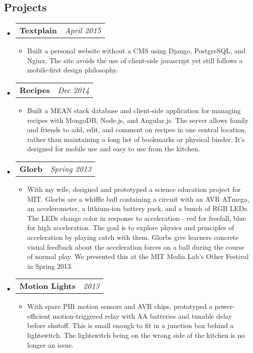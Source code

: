\documentclass[10pt,letterpaper]{article}
\newcommand{\headerrow}[2]{%
    \begin{tabularx}{\linewidth}{Xr}
	    #1 & #2 \\
    \end{tabularx}
}
\begin{document}
\subsection*{Projects}
    \begin{itemize}
        \item \headerrow{\textbf{Textplain}}{\textit{April 2015}}
        \begin{itemize}
            \item Built a personal website without a CMS using Django,
                PostgreSQL, and Nginx.  The site avoids the use of client-side
                javascript yet still follows a mobile-first design philosophy.
        \end{itemize}

        \item \headerrow{\textbf{Recipes}}{\textit{Dec 2014}}
        \begin{itemize}
            \item Built a MEAN stack database and client-side application for
                managing recipes with MongoDB, Node.js, and Angular.js.  The
                server allows family and friends to add, edit, and comment on
                recipes in one central location, rather than maintaining a long
                list of bookmarks or physical binder.  It's designed for mobile
                use and easy to use from the kitchen.
        \end{itemize}

        \item \headerrow{\textbf{Glorb}}{\textit{Spring 2013}}
        \begin{itemize}
            \item With my wife, designed and prototyped a science education
                project for MIT\@.  Glorbs are a whiffle ball containing a
                circuit with an AVR ATmega, an accelerometer, a lithium-ion
                battery pack, and a bunch of RGB LEDs.  The LEDs change color
                in response to acceleration---red for freefall, blue for high
                acceleration.  The goal is to explore physics and principles of
                acceleration by playing catch with them.  Glorbs give learners
                concrete visual feedback about the acceleration forces on a
                ball during the course of normal play.  We presented this at
                the MIT Media Lab's Other Festival in Spring 2013.
        \end{itemize}

        \item \headerrow{\textbf{Motion Lights}}{\textit{2013}}
        \begin{itemize}
            \item With spare PIR motion sensors and AVR chips, prototyped a
                power-efficient motion-triggered relay with AA batteries and
                tunable delay before shutoff.  This is small enough to fit in a
                junction box behind a lightswitch.  The lightswitch being on
                the wrong side of the kitchen is no longer an issue.
        \end{itemize}
    \end{itemize}
\end{document}
